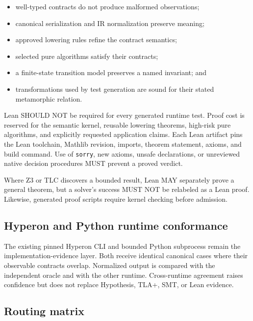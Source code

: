 \documentclass[10pt]{article}
\begin{document}
\begin{enumerate}
\begin{itemize}
\item well-typed contracts do not produce malformed observations;
\item canonical serialization and IR normalization preserve meaning;
\item approved lowering rules refine the contract semantics;
\item selected pure algorithms satisfy their contracts;
\item a finite-state transition model preserves a named invariant; and
\item transformations used by test generation are sound for their stated
metamorphic relation.
\end{itemize}

Lean SHOULD NOT be required for every generated runtime test.  Proof cost is
reserved for the semantic kernel, reusable lowering theorems, high-risk pure
algorithms, and explicitly requested application claims.  Each Lean artifact
pins the Lean toolchain, Mathlib revision, imports, theorem statement, axioms,
and build command.  Use of \texttt{sorry}, new axioms, unsafe declarations, or
unreviewed native decision procedures MUST prevent a proved verdict.

Where Z3 or TLC discovers a bounded result, Lean MAY separately prove a
general theorem, but a solver's success MUST NOT be relabeled as a Lean proof.
Likewise, generated proof scripts require kernel checking before admission.

\subsection{Hyperon and Python runtime conformance}

The existing pinned Hyperon CLI and bounded Python subprocess remain the
implementation-evidence layer.  Both receive identical canonical cases where
their observable contracts overlap.  Normalized output is compared with the
independent oracle and with the other runtime.  Cross-runtime agreement raises
confidence but does not replace Hypothesis, TLA+, SMT, or Lean evidence.

\subsection{Routing matrix}


\end{enumerate}
\end{document}
